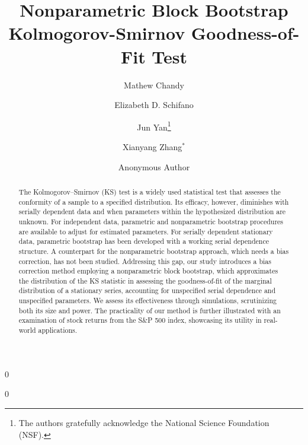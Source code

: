 \documentclass[12pt]{article}
\newcommand{\blind}{0}
\begin{document}
%

\def\spacingset#1{\renewcommand{\baselinestretch}%
{#1}\small\normalsize} \spacingset{1}



\title{\bf Nonparametric Block Bootstrap Kolmogorov-Smirnov Goodness-of-Fit Test}
\blind
{
  \author[1,2]{Mathew Chandy}
  \author[1]{Elizabeth D. Schifano}
  \author[1]{Jun Yan\thanks{
    The authors gratefully acknowledge the National Science Foundation (NSF).}\hspace{.2cm}}
  \author[3]{Xianyang Zhang$^{\ast}$ }
  \maketitle
} \fi

\blind
{
  \bigskip
  \bigskip
  \bigskip
  \author{Anonymous Author}
} \fi

\maketitle

\bigskip
\begin{abstract}
The Kolmogorov--Smirnov (KS) test is a widely used statistical test that
assesses the conformity of a sample to a specified distribution. Its efficacy,
however, diminishes with serially dependent data and when parameters
within the hypothesized distribution are unknown. For independent data,
parametric and nonparametric bootstrap procedures are available to adjust for
estimated parameters. For serially dependent stationary data, parametric
bootstrap has been developed with a working serial dependence structure. A
counterpart for the nonparametric bootstrap approach, which needs a bias
correction, has not been studied. Addressing this gap, our study introduces a
bias correction method employing a nonparametric block bootstrap, which
approximates the distribution of the KS statistic in assessing the
goodness-of-fit of the marginal distribution of a stationary series,
accounting for unspecified
serial dependence and unspecified parameters. We assess its effectiveness
through simulations, scrutinizing both its size and power. The practicality of
our method is further illustrated with an examination of stock returns from the
S\&P 500 index, showcasing its utility in real-world
applications.
\end{abstract}
\end{document}
